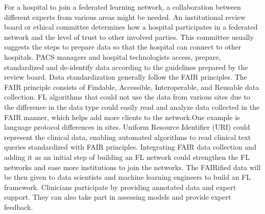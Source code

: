  
 
 For a hospital to join a federated learning network, a collaboration between different experts from various areas might be needed. An institutional review board or ethical committee determines how a hospital participates in a federated network and the level of trust to other involved parties. This committee usually suggests the steps to prepare data so that the hospital can connect to other hospitals. PACS managers and hospital technologists access, prepare, standardized and de-identify data according to the guidelines prepared by the review board. Data standardization generally follow the FAIR principles. The FAIR principle consists of Findable, Accessible, Interoperable, and Reusable data collection\cite{wilkinson2016fair}. FL algorithms that could not use the data from various sites due to the difference in the data type could easily read and analyze data collected in the FAIR manner, which helps add more clients to the network.One example is language protocol differences in sites. Uniform Resource Identifier (URI) could represent the clinical data, enabling automated algorithms to read clinical text queries standardized with FAIR principles\cite{masinter2005uniform}. Integrating FAIR data collection and adding it as an initial step of building an FL network could strengthen the FL networks and ease more institutions to join the networks.
 The FAIRified data will be then given to data scientists and machine learning engineers to build an FL framework.  Clinicians participate by providing annotated data and expert support. They can also take part in assessing models and provide expert feedback. 


